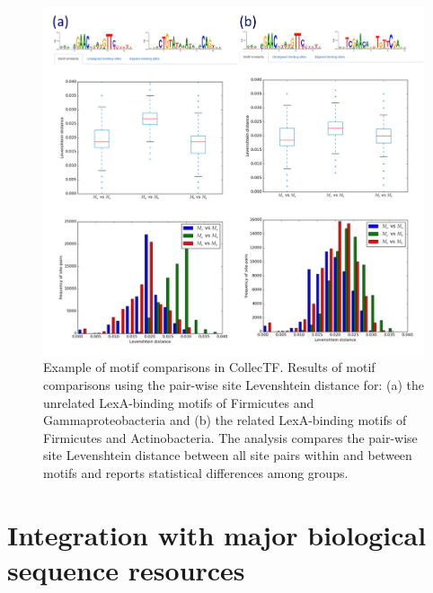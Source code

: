 \begin{figure}
  \centering
  \includegraphics[width=\textwidth]{figures/chapter2/motif-comparison}
  \caption{Example of motif comparisons in CollecTF\@. Results of motif
    comparisons using the pair-wise site Levenshtein distance for: (a) the
    unrelated LexA-binding motifs of Firmicutes and Gammaproteobacteria and (b)
    the related LexA-binding motifs of Firmicutes and Actinobacteria. The
    analysis compares the pair-wise site Levenshtein distance between all site
    pairs within and between motifs and reports statistical differences among
    groups.}
\label{fig:motif-comparison}
\end{figure}

\section{Integration with major biological sequence resources}

